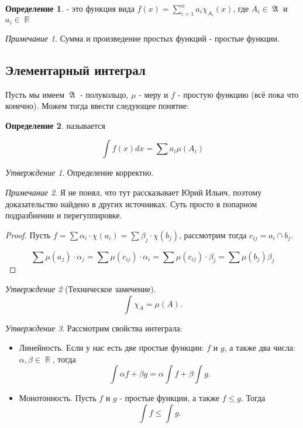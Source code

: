 \documentclass[a4paper]{article}
\theoremstyle{indented}
\theoremstyle{definition}
\newtheorem{defn}{Определение}
\theoremstyle{remark}
\newtheorem{remark}{Примечание}
\newtheorem{stat}{Утверждение}
\DeclareMathOperator{\RR}{\mathbb{R}}
\DeclareMathOperator{\GA}{\mathfrak{A}}
\begin{document}
\begin{defn}
     - это функция вида $f(x)=\sum_{i=1}^n a_i \chi_{A_i}(x)$, где $A_i \in \GA$ и $a_i \in \RR$
\end{defn}

\begin{remark}
    Сумма и произведение простых функций - простые функции.
\end{remark}

\subsection{Элементарный интеграл}

Пусть мы имеем $\GA$ - полукольцо, $\mu$ - меру и $f$ - простую функцию (всё пока что конечно). Можем тогда ввести следующее понятие:

\begin{defn}
     называется 

    \[
        \int f(x)dx = \sum a_i \mu(A_i)
    \]
\end{defn}

\begin{stat}
    Определение корректно.
\end{stat}

\begin{remark}
    Я не понял, что тут рассказывает Юрий Ильич, поэтому доказательство найдено в других источниках. Суть просто в попарном подразбиении и перегуппировке.
\end{remark}

\begin{proof}
    Пусть $f = \sum \alpha_i \cdot \chi(a_i) = \sum \beta_j \cdot \chi(b_j)$, рассмотрим тогда $c_{ij} = a_i \cap b_j$.  

    \[
        \sum \mu(a_j) \cdot \alpha_j = \sum \mu(c_{ij}) \cdot \alpha_i = \sum \mu(c_{ij}) \cdot \beta_j = \sum \mu(b_j) \beta_j
    \]
\end{proof}

\begin{stat}[Техническое замечение]
    \[
        \int \chi_A = \mu(A).
    \]
\end{stat}

\begin{stat}
    Рассмотрим свойства интеграла: 

    \begin{itemize}
        \item Линейность. Если у нас есть две простые функции: $f$ и $g$, а также два числа: $\alpha, \beta \in \RR$, тогда 
        \[
            \int \alpha f + \beta g = \alpha \int f + \beta \int g.
        \]
        \item Монотонность. Пусть $f$ и $g$ - простые функции, а также $f \leq g$. Тогда 
        \[
            \int f \leq \int g.
        \]
    \end{itemize}
\end{stat}
\end{document}
